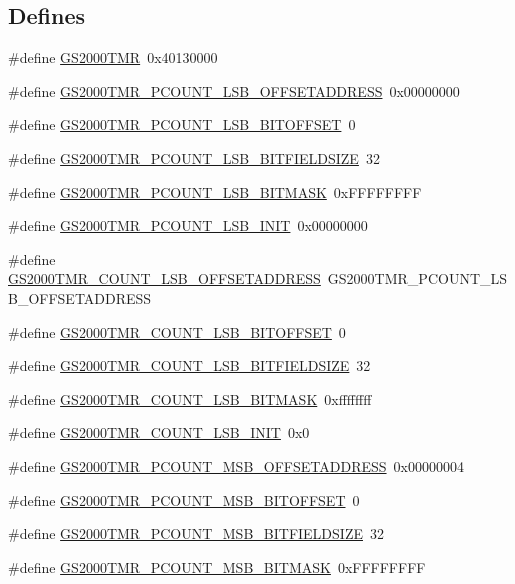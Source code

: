 \subsection*{Defines}
\begin{DoxyCompactItemize}
\item 
\#define \hyperlink{a00556_ab36d4df87832018e11a45e11a5545dd5}{GS2000TMR}~0x40130000
\item 
\#define \hyperlink{a00556_a2bf3ff08b73f5fd970f082d69d3ba677}{GS2000TMR\_\-PCOUNT\_\-LSB\_\-OFFSETADDRESS}~0x00000000
\item 
\#define \hyperlink{a00556_ac7a0ebea1f686e292af01051841a12ce}{GS2000TMR\_\-PCOUNT\_\-LSB\_\-BITOFFSET}~0
\item 
\#define \hyperlink{a00556_aebf7db775779b851789d3046ca308af2}{GS2000TMR\_\-PCOUNT\_\-LSB\_\-BITFIELDSIZE}~32
\item 
\#define \hyperlink{a00556_aafe003276f7c55c8987bada13ed456af}{GS2000TMR\_\-PCOUNT\_\-LSB\_\-BITMASK}~0xFFFFFFFF
\item 
\#define \hyperlink{a00556_ab049dbe109274a2cb5d0722ed1390e8d}{GS2000TMR\_\-PCOUNT\_\-LSB\_\-INIT}~0x00000000
\item 
\#define \hyperlink{a00556_a6c5709a2cf8419a6c4a7488587cb9a16}{GS2000TMR\_\-COUNT\_\-LSB\_\-OFFSETADDRESS}~GS2000TMR\_\-PCOUNT\_\-LSB\_\-OFFSETADDRESS
\item 
\#define \hyperlink{a00556_a2b98873e5fb2c260b0259c1da9da54dc}{GS2000TMR\_\-COUNT\_\-LSB\_\-BITOFFSET}~0
\item 
\#define \hyperlink{a00556_a0212bbfa14da78a7d292581e6925467d}{GS2000TMR\_\-COUNT\_\-LSB\_\-BITFIELDSIZE}~32
\item 
\#define \hyperlink{a00556_aff7534ff1a0d3989d8c36af6d13f541c}{GS2000TMR\_\-COUNT\_\-LSB\_\-BITMASK}~0xffffffff
\item 
\#define \hyperlink{a00556_adc6a4cac5cb40c528ab8172ae7838259}{GS2000TMR\_\-COUNT\_\-LSB\_\-INIT}~0x0
\item 
\#define \hyperlink{a00556_a4c232f7ca22cc0b7494aa8f08756cf50}{GS2000TMR\_\-PCOUNT\_\-MSB\_\-OFFSETADDRESS}~0x00000004
\item 
\#define \hyperlink{a00556_aa283db47bbea99495c8d23fa010fabb9}{GS2000TMR\_\-PCOUNT\_\-MSB\_\-BITOFFSET}~0
\item 
\#define \hyperlink{a00556_ac6c0c69ec53d73b4381876caa8cbb4ce}{GS2000TMR\_\-PCOUNT\_\-MSB\_\-BITFIELDSIZE}~32
\item 
\#define \hyperlink{a00556_aac3db8c65d5c478037e0f86f990fd50b}{GS2000TMR\_\-PCOUNT\_\-MSB\_\-BITMASK}~0xFFFFFFFF

\end{DoxyCompactItemize}
